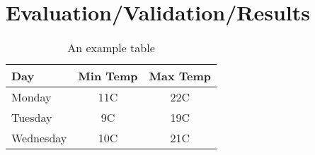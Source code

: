 \chapter{Evaluation/Validation/Results}

\lipsum[1]

\begin{table}[h]\centering
	\begin{tabular}{|l|c|c|}
		\hline
		Day & Min Temp & Max Temp \\ \hline
		Monday & 11C & 22C \\ \hline
		Tuesday & 9C & 19C \\ \hline
		Wednesday & 10C & 21C \\
		\hline
	\end{tabular}
	\caption{An example table}
	\label{tab:exampleTable}
\end{table}